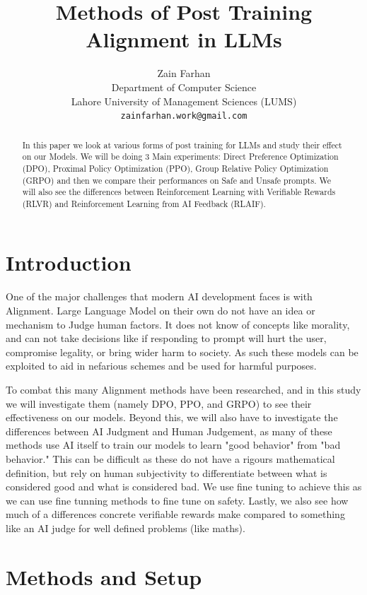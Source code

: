 \documentclass{article}
\title{Methods of Post Training Alignment in LLMs}
\author{%
  Zain Farhan \\
  Department of Computer Science \\
  Lahore University of Management Sciences (LUMS) \\
  \texttt{zainfarhan.work@gmail.com} \\
}
\begin{document}
\maketitle


\begin{abstract}
  In this paper we look at various forms of post training for LLMs and study their effect on our Models.
  We will be doing 3 Main experiments: Direct Preference Optimization (DPO), Proximal Policy Optimization (PPO), Group Relative
  Policy Optimization (GRPO) and then we compare their performances on Safe and Unsafe prompts. We will also see the differences
  between Reinforcement Learning with Verifiable Rewards (RLVR) and Reinforcement Learning from AI
  Feedback (RLAIF).
\end{abstract}

\section{Introduction}

One of the major challenges that modern AI development faces is with Alignment. Large Language Model on their own do not have an idea or mechanism to Judge
human factors. It does not know of concepts like morality, and can not take decisions like if responding to prompt will hurt the user, compromise legality, or bring
wider harm to society. As such these models can be exploited to aid in nefarious schemes and be used for harmful purposes.

To combat this many Alignment methods have been researched, and in this study we will investigate them (namely DPO, PPO, and GRPO) to see their effectiveness on our models.
Beyond this, we will also have to investigate the differences between AI Judgment and Human Judgement, as many of these methods use AI itself to train our models to learn
"good behavior" from "bad behavior." This can be difficult as these do not have a rigours mathematical definition, but rely on human subjectivity to differentiate between what is
considered good and what is considered bad. We use fine tuning to achieve this as we can use fine tunning methods to fine tune on safety. Lastly, we also see how much of a differences
concrete verifiable rewards make compared to something like an AI judge for well defined problems (like maths).


\section{Methods and Setup}
\end{document}
